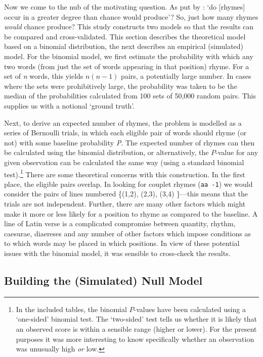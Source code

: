 \documentclass[twocolumn, switch, a4paper]{article} %
\begin{document}
Now we come to the nub of the motivating question. As put by : `do [rhymes] occur in a greater degree than
chance would produce'? So, just how many rhymes \emph{would} chance produce?
This study constructs two models so that the results can be compared and
cross-validated. This section describes the theoretical model based on a
binomial distribution, the next describes an empirical (simulated) model. For
the binomial model, we first estimate the probability with which any two words
(from just the set of words appearing in that position) rhyme. For a set of
\emph{n} words, this yields $n(n-1)$ pairs, a potentially large number. In
cases where the sets were prohibitively large, the probability was taken to be
the median of the probabilities calculated from 100 sets of 50,000 random
pairs. This supplies us with a notional `ground truth'.

Next, to derive an expected number of rhymes, the problem is modelled as a
series of Bernoulli trials, in which each eligible pair of words should rhyme
(or not) with some baseline probability \emph{P}. The expected number of
rhymes can then be calculated using the binomial distribution, or
alternatively, the $P$-value for any given observation can be calculated the
same way (using a standard binomial test).\footnote{
  In the included tables, the binomial $P$-values have been calculated using a
  `one-sided' binomial test. The `two-sided' test tells us whether it is likely
  that an observed score is within a sensible range (higher or lower). For the
  present purposes it was more interesting to know specifically whether an
  observation was unusually high \emph{or} low.
}
There are some theoretical concerns with this construction. In the first
place, the eligible pairs overlap. In looking for couplet rhymes (\texttt{aa
-1}) we would consider the pairs of lines numbered \{(1,2), (2,3), (3,4)
\textellipsis\}---this means that the trials are not independent. Further,
there are many other factors which might make it more or less likely for a
position to rhyme as compared to the baseline. A line of Latin verse is a
complicated compromise between quantity, rhythm, caesurae, diaereses and any
number of other factors which impose conditions as to which words may be
placed in which positions. In view of these potential issues with the binomial
model, it was sensible to cross-check the results.

\subsection{Building the (Simulated) Null Model} 
\end{document}
